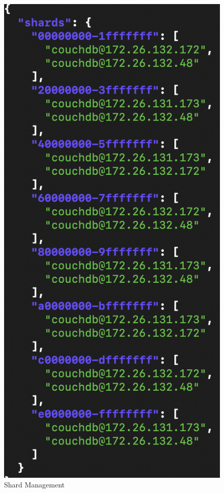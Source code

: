   
 \begin{figure}[H]
    \centering
    \includegraphics[scale=0.4]{city_analytics/report/images/shardscovid.png}
    \caption{Shard Management}
    \label{fig:shard}
\end{figure}

